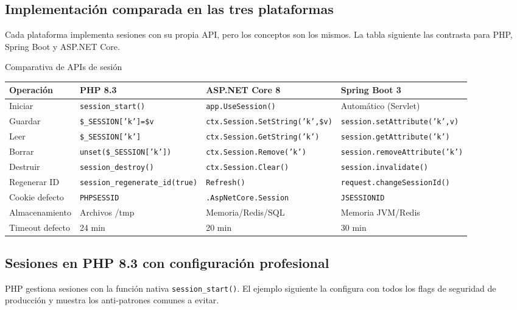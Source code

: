 \documentclass[11pt,a4paper,openany]{book}
\begin{document}
\subsection{Implementación comparada en las tres plataformas}

Cada plataforma implementa sesiones con su propia API, pero
los conceptos son los mismos. La tabla siguiente las contrasta para
PHP, Spring Boot y ASP.NET Core.


\begin{cajacompara}{Comparativa de APIs de sesión}
\centering
\footnotesize
\begin{tabularx}{\textwidth}{lXXX}
\toprule
\textbf{Operación} & \textbf{PHP 8.3} & \textbf{ASP.NET Core 8} & \textbf{Spring Boot 3}\\
\midrule
Iniciar     & \texttt{session\_start()} & \texttt{app.UseSession()} & Automático (Servlet)\\
Guardar     & \texttt{\$\_SESSION['k']=\$v} & \texttt{ctx.Session.SetString('k',\$v)} & \texttt{session.setAttribute('k',v)}\\
Leer        & \texttt{\$\_SESSION['k']} & \texttt{ctx.Session.GetString('k')} & \texttt{session.getAttribute('k')}\\
Borrar      & \texttt{unset(\$\_SESSION['k'])} & \texttt{ctx.Session.Remove('k')} & \texttt{session.removeAttribute('k')}\\
Destruir    & \texttt{session\_destroy()} & \texttt{ctx.Session.Clear()} & \texttt{session.invalidate()}\\
Regenerar ID & \texttt{session\_regenerate\_id(true)} & \texttt{Refresh()} & \texttt{request.changeSessionId()}\\
Cookie defecto & \texttt{PHPSESSID} & \texttt{.AspNetCore.Session} & \texttt{JSESSIONID}\\
Almacenamiento & Archivos /tmp & Memoria/Redis/SQL & Memoria JVM/Redis\\
Timeout defecto & 24 min & 20 min & 30 min\\
\bottomrule
\end{tabularx}
\end{cajacompara}

\subsection{Sesiones en PHP 8.3 con configuración profesional}

PHP gestiona sesiones con la función nativa
\texttt{session\_start()}. El ejemplo siguiente la configura con todos
los flags de seguridad de producción y muestra los anti-patrones
comunes a evitar.
\end{document}
